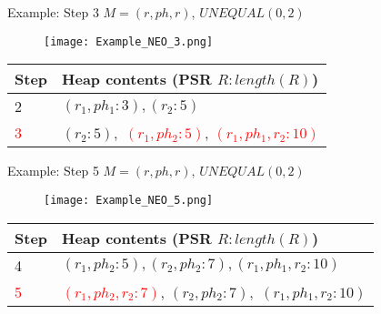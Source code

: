 \begin{frame}[noframenumbering]{Example: Step 3}
	$M = (r, ph, r)$, $UNEQUAL(0, 2)$
	
	\begin{figure}[h]
		\texttt{[image: Example\_NEO\_3.png]}
	\end{figure}
	
	\begin{table}[h]
		\centering
		\begin{tabular}{ |l|p{10cm}| } 
			\hline
			Step & Heap contents (PSR $R : length(R)$) \\
			\hline
			2 & $(r_1, ph_1 : 3), (r_2 : 5)$ \\ 
			\hline
			\textcolor{red}{3} & $(r_2 : 5), $ \textcolor{red}{$(r_1, ph_2 : 5)$}, \textcolor{red}{$(r_1, ph_1, r_2 : 10)$} \\
			\hline 
		\end{tabular}
	\end{table}

\end{frame}

\begin{frame}[noframenumbering]{Example: Step 5}
	$M = (r, ph, r)$, $UNEQUAL(0, 2)$
	
	\begin{figure}[h]
		\texttt{[image: Example\_NEO\_5.png]}
	\end{figure}
	
	\begin{table}[h]
		\centering
		\begin{tabular}{ |l|p{10cm}| } 
			\hline
			Step & Heap contents (PSR $R : length(R)$) \\
			\hline
			4 & $(r_1, ph_2 : 5), (r_2, ph_2 : 7), (r_1, ph_1, r_2 : 10)$ \\ 
			\hline
			\textcolor{red}{5} & \textcolor{red}{$(r_1, ph_2, r_2 : 7)$}, $(r_2, ph_2 : 7),$ \st{$(r_1, ph_1, r_2 : 10)$} \\ 
			\hline
		\end{tabular}
	\end{table}

\end{frame}

